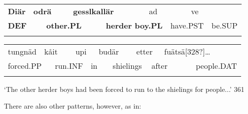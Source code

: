 \begin{tabular}{llllllllll}
\lsptoprule
{\bfseries Diär} & \multicolumn{2}{l}{{\bfseries odrä}

} & \multicolumn{2}{l}{{\bfseries gesslkallär}

} & \multicolumn{2}{l}{ad

} & \multicolumn{2}{l}{ve

} & \\
\multicolumn{2}{l}{{\bfseries DEF}

} & \multicolumn{2}{l}{{\bfseries other.PL}

} & \multicolumn{2}{l}{{\bfseries herder boy.PL}

} & \multicolumn{2}{l}{have.PST

} & \multicolumn{2}{l}{be.SUP

}\\
\lspbottomrule
\end{tabular}

\begin{tabular}{llllllllllll}
\lsptoprule
tungnäd & \multicolumn{2}{l}{kåit

} & \multicolumn{2}{l}{upi

} & \multicolumn{2}{l}{budär

} & \multicolumn{2}{l}{etter

} & \multicolumn{2}{l}{fuätsä[328?]…

} & \\
\multicolumn{2}{l}{forced.PP

} & \multicolumn{2}{l}{run.INF

} & \multicolumn{2}{l}{in

} & \multicolumn{2}{l}{shielings

} & \multicolumn{2}{l}{after

} & \multicolumn{2}{l}{people.DAT

}\\
\lspbottomrule
\end{tabular}

\begin{styleTranslation}
‘The other herder boys had been forced to run to the shielings for people...’ 361

\end{styleTranslation}

\begin{styleBodyTextFirst}
There are also other patterns, however, as in:

\end{styleBodyTextFirst}

